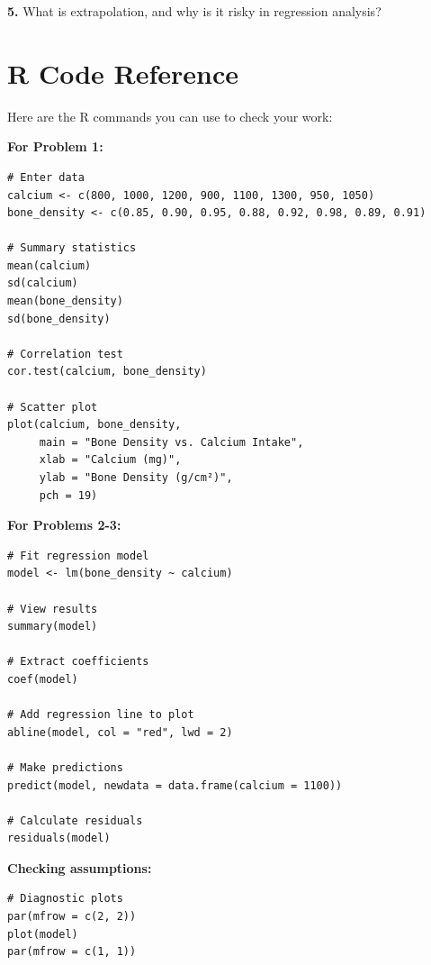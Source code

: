 \documentclass[11pt]{article}
\begin{document}
\vspace{3cm}

\textbf{5.} What is extrapolation, and why is it risky in regression analysis?

\vspace{3cm}

\newpage

\section*{R Code Reference}

Here are the R commands you can use to check your work:

\vspace{0.5cm}

\textbf{For Problem 1:}
\begin{verbatim}
# Enter data
calcium <- c(800, 1000, 1200, 900, 1100, 1300, 950, 1050)
bone_density <- c(0.85, 0.90, 0.95, 0.88, 0.92, 0.98, 0.89, 0.91)

# Summary statistics
mean(calcium)
sd(calcium)
mean(bone_density)
sd(bone_density)

# Correlation test
cor.test(calcium, bone_density)

# Scatter plot
plot(calcium, bone_density,
     main = "Bone Density vs. Calcium Intake",
     xlab = "Calcium (mg)",
     ylab = "Bone Density (g/cm²)",
     pch = 19)
\end{verbatim}

\vspace{0.5cm}

\textbf{For Problems 2-3:}
\begin{verbatim}
# Fit regression model
model <- lm(bone_density ~ calcium)

# View results
summary(model)

# Extract coefficients
coef(model)

# Add regression line to plot
abline(model, col = "red", lwd = 2)

# Make predictions
predict(model, newdata = data.frame(calcium = 1100))

# Calculate residuals
residuals(model)
\end{verbatim}

\vspace{0.5cm}

\textbf{Checking assumptions:}
\begin{verbatim}
# Diagnostic plots
par(mfrow = c(2, 2))
plot(model)
par(mfrow = c(1, 1))
\end{verbatim}
\end{document}
